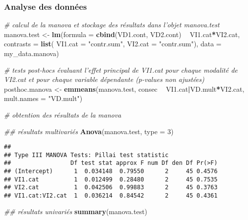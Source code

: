 \documentclass[
]{book}
\newenvironment{Shaded}{\begin{snugshade}}{\end{snugshade}}
\newcommand{\CommentTok}[1]{\textcolor[rgb]{0.56,0.35,0.01}{\textit{#1}}}
\newcommand{\DataTypeTok}[1]{\textcolor[rgb]{0.13,0.29,0.53}{#1}}
\newcommand{\DecValTok}[1]{\textcolor[rgb]{0.00,0.00,0.81}{#1}}
\newcommand{\KeywordTok}[1]{\textcolor[rgb]{0.13,0.29,0.53}{\textbf{#1}}}
\newcommand{\NormalTok}[1]{#1}
\newcommand{\OperatorTok}[1]{\textcolor[rgb]{0.81,0.36,0.00}{\textbf{#1}}}
\newcommand{\StringTok}[1]{\textcolor[rgb]{0.31,0.60,0.02}{#1}}
\begin{document}
\hypertarget{analyse-des-donnuxe9es-20}{%
\subsubsection{Analyse des données}\label{analyse-des-donnuxe9es-20}}

\begin{Shaded}
\begin{Highlighting}[]
\CommentTok{# calcul de la manova et stockage des résultats dans l’objet manova.test}
\NormalTok{manova.test <-}\StringTok{ }\KeywordTok{lm}\NormalTok{(}\DataTypeTok{formula =} \KeywordTok{cbind}\NormalTok{(VD1.cont, VD2.cont) }\OperatorTok{~}\StringTok{ }\NormalTok{VI1.cat}\OperatorTok{*}\NormalTok{VI2.cat, }
                  \DataTypeTok{contrasts =} \KeywordTok{list}\NormalTok{(}
                    \DataTypeTok{VI1.cat =} \StringTok{"contr.sum"}\NormalTok{,}
                    \DataTypeTok{VI2.cat =} \StringTok{"contr.sum"}\NormalTok{),}
                 \DataTypeTok{data =}\NormalTok{ my_data.manova)}

\CommentTok{# tests post-hocs évaluant l'effet principal de VI1.cat pour chaque modalité de VI2.cat et pour chaque variable dépendante (p-values non ajustées)}
\NormalTok{posthoc.manova <-}\StringTok{ }\KeywordTok{emmeans}\NormalTok{(manova.test, consec }\OperatorTok{~}\StringTok{ }\NormalTok{VI1.cat}\OperatorTok{|}\NormalTok{VD.mult}\OperatorTok{*}\NormalTok{VI2.cat, }\DataTypeTok{mult.names =} \StringTok{"VD.mult"}\NormalTok{)}

\CommentTok{# obtention des résultats de la manova}

\CommentTok{## résultats multivariés }
\KeywordTok{Anova}\NormalTok{(manova.test, }\DataTypeTok{type =} \DecValTok{3}\NormalTok{)}
\end{Highlighting}
\end{Shaded}

\begin{verbatim}
## 
## Type III MANOVA Tests: Pillai test statistic
##                 Df test stat approx F num Df den Df Pr(>F)
## (Intercept)      1  0.034148  0.79550      2     45 0.4576
## VI1.cat          1  0.012499  0.28480      2     45 0.7535
## VI2.cat          1  0.042506  0.99883      2     45 0.3763
## VI1.cat:VI2.cat  1  0.036214  0.84542      2     45 0.4361
\end{verbatim}

\begin{Shaded}
\begin{Highlighting}[]
\CommentTok{## résultats univariés }
\KeywordTok{summary}\NormalTok{(manova.test)}
\end{Highlighting}
\end{Shaded}
\end{document}
